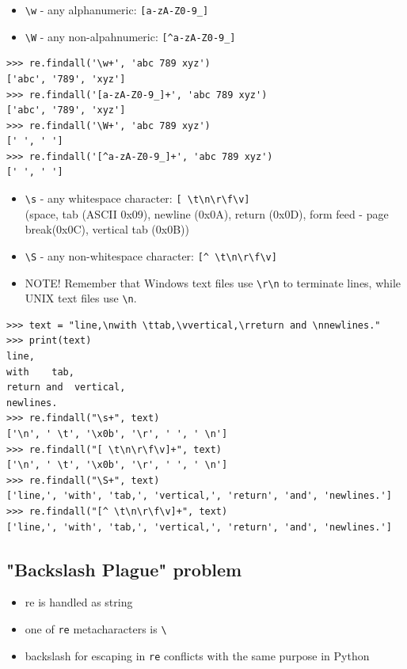 \documentclass{beamer}
\begin{document}
\begin{frame}[fragile]
\begin{itemize}
\item \verb/\w/ - any alphanumeric: \verb/[a-zA-Z0-9_]/
\item \verb/\W/ - any non-alpahnumeric: \verb/[^a-zA-Z0-9_]/
\end{itemize}
\begin{lstlisting}
>>> re.findall('\w+', 'abc 789 xyz')
['abc', '789', 'xyz']
>>> re.findall('[a-zA-Z0-9_]+', 'abc 789 xyz')
['abc', '789', 'xyz']
>>> re.findall('\W+', 'abc 789 xyz')
[' ', ' ']
>>> re.findall('[^a-zA-Z0-9_]+', 'abc 789 xyz')
[' ', ' ']
\end{lstlisting}
\end{frame}

\begin{frame}[fragile]
\begin{itemize}
\item \verb/\s/ - any whitespace character: \verb/[ \t\n\r\f\v]/ \\ (space, tab (ASCII 0x09), newline (0x0A), return (0x0D), form feed - page break(0x0C), vertical tab (0x0B))
\item \verb/\S/ - any non-whitespace character: \verb/[^ \t\n\r\f\v]/
\pause
\item NOTE! Remember that Windows text files use \verb/\r\n/ to terminate lines, while UNIX text files use \verb/\n/.
\end{itemize}
\end{frame}

\begin{frame}[fragile]
\begin{lstlisting}
>>> text = "line,\nwith \ttab,\vvertical,\rreturn and \nnewlines."
>>> print(text)
line,
with    tab,
return and  vertical,
newlines.
>>> re.findall("\s+", text)
['\n', ' \t', '\x0b', '\r', ' ', ' \n']
>>> re.findall("[ \t\n\r\f\v]+", text)
['\n', ' \t', '\x0b', '\r', ' ', ' \n']
>>> re.findall("\S+", text)
['line,', 'with', 'tab,', 'vertical,', 'return', 'and', 'newlines.']
>>> re.findall("[^ \t\n\r\f\v]+", text)
['line,', 'with', 'tab,', 'vertical,', 'return', 'and', 'newlines.']
\end{lstlisting}
\end{frame}

\subsection{"Backslash Plague" problem}
\begin{frame}[fragile]
\begin{itemize}
\item re is handled as string
\item one of \verb/re/ metacharacters is \verb/\/
\item backslash for escaping in \verb/re/ conflicts with the same purpose in Python
\end{itemize}
\end{frame}
\end{document}
